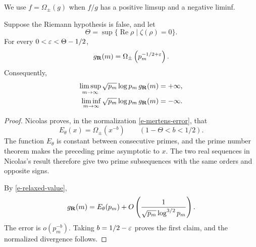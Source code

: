 We use \(f=\Omega_\pm(g)\) when \(f/g\) has a positive limsup and a
negative liminf.

\begin{theorem}
\label{thm-off-rh-relaxed}
Suppose the Riemann hypothesis is false, and let
\[
    \Theta
    =
    \sup\{\operatorname{Re}\rho\mid\zeta(\rho)=0\}.
\]
For every \(0<\varepsilon<\Theta-1/2\),
\[
    g_{\mathbf{R}}(m)
    =
    \Omega_\pm\left(p_m^{-1/2+\varepsilon}\right).
\]
Consequently,
\[
\begin{aligned}
    \limsup_{m\to\infty}
    \sqrt{p_m}\log p_m\,g_{\mathbf{R}}(m)
    &=+\infty,\\
    \liminf_{m\to\infty}
    \sqrt{p_m}\log p_m\,g_{\mathbf{R}}(m)
    &=-\infty.
\end{aligned}
\]
\end{theorem}

\begin{proof}
Nicolas
\cite[Theorem~3(c)]{nicolas-1983-petites-valeurs} proves, in the
normalization \eqref{e-mertens-error}, that
\[
    E_\theta(x)=\Omega_\pm(x^{-b})
    \qquad
    (1-\Theta<b<1/2).
\]
The function \(E_\theta\) is constant between consecutive primes, and
the prime number theorem makes the preceding prime asymptotic to \(x\).
The two real sequences in Nicolas's result therefore give two prime
subsequences with the same orders and opposite signs.

By \eqref{e-relaxed-value},
\[
    g_{\mathbf{R}}(m)
    =
    E_\theta(p_m)
    +
    O\left(
        \frac{1}{\sqrt{p_m}\log^{3/2}p_m}
    \right).
\]
The error is \(o(p_m^{-b})\). Taking \(b=1/2-\varepsilon\) proves the first
claim, and the normalized divergence follows.
\end{proof}
